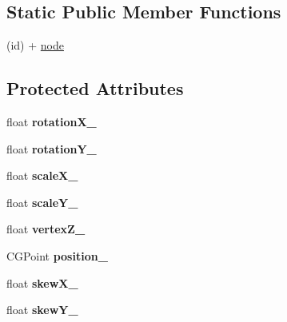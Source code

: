 \subsection*{Static Public Member Functions}
\begin{DoxyCompactItemize}
\item 
(id) + \hyperlink{class_c_c_node_a9493a9f28bcf4afcb95c66e31677d867}{node}
\end{DoxyCompactItemize}
\subsection*{Protected Attributes}
\begin{DoxyCompactItemize}
\item 
\hypertarget{class_c_c_node_a600b9d9b6f444c26f88cd175a19ef41c}{float {\bfseries rotation\-X\-\_\-}}\label{class_c_c_node_a600b9d9b6f444c26f88cd175a19ef41c}

\item 
\hypertarget{class_c_c_node_a730ae2402e5128beef52609b084ff435}{float {\bfseries rotation\-Y\-\_\-}}\label{class_c_c_node_a730ae2402e5128beef52609b084ff435}

\item 
\hypertarget{class_c_c_node_a43616c883969a1dc29142d2d8fe5399e}{float {\bfseries scale\-X\-\_\-}}\label{class_c_c_node_a43616c883969a1dc29142d2d8fe5399e}

\item 
\hypertarget{class_c_c_node_aa38abea726a622bf6c9f4148881ac087}{float {\bfseries scale\-Y\-\_\-}}\label{class_c_c_node_aa38abea726a622bf6c9f4148881ac087}

\item 
\hypertarget{class_c_c_node_ab790776b9a5cae2f917dc89353753da2}{float {\bfseries vertex\-Z\-\_\-}}\label{class_c_c_node_ab790776b9a5cae2f917dc89353753da2}

\item 
\hypertarget{class_c_c_node_a244a8a007902d7f5a118aa4213856b66}{C\-G\-Point {\bfseries position\-\_\-}}\label{class_c_c_node_a244a8a007902d7f5a118aa4213856b66}

\item 
\hypertarget{class_c_c_node_a20bd61cd03f6e80ed3b778040be14d91}{float {\bfseries skew\-X\-\_\-}}\label{class_c_c_node_a20bd61cd03f6e80ed3b778040be14d91}

\item 
\hypertarget{class_c_c_node_a741941f7c4493c65e133d52202ca4251}{float {\bfseries skew\-Y\-\_\-}}\label{class_c_c_node_a741941f7c4493c65e133d52202ca4251}


\end{DoxyCompactItemize}

